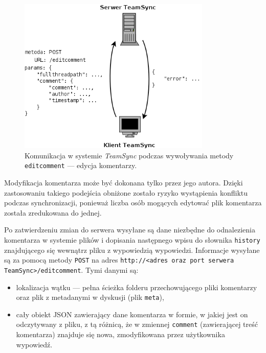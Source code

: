 \begin{figure}[h!]
  \vspace{5pt}
  \begin{center}
    \includegraphics[width=260pt]{figures/meteditcomment.png}
  \end{center}
  \caption{Komunikacja w systemie \emph{TeamSync} podczas wywoływania metody \texttt{editcomment} --- edycja komentarzy.}
  \label{picmetdeletefolder}
\end{figure}

Modyfikacja komentarza może być dokonana tylko przez jego autora. Dzięki zastosowaniu takiego podejścia obniżone zostało ryzyko wystąpienia konfliktu podczas synchronizacji, ponieważ liczba osób mogących edytować plik komentarza została zredukowana do jednej.

Po zatwierdzeniu zmian do serwera wysyłane są dane niezbędne do odnalezienia komentarza w systemie plików i dopisania następnego wpisu do słownika \texttt{history} znajdującego się wewnątrz pliku z wypowiedzią wypowiedzi. Informacje wysyłane są za pomocą metody \texttt{POST} na adres \texttt{http://<adres oraz port\- serwera TeamSync>/\-editcomment}. Tymi danymi są:

\begin{itemize}[noitemsep]
  \item lokalizacja wątku --- pełna ścieżka folderu przechowującego pliki komentarzy oraz plik z metadanymi w dyskusji (plik \texttt{meta}),
  
  \item cały obiekt JSON zawierający dane komentarza w formie, w jakiej jest on odczytywany z pliku, z tą różnicą, że w zmiennej \texttt{comment} (zawierającej treść komentarza) znajduje się nowa, zmodyfikowana przez użytkownika wypowiedź.
\end{itemize}

